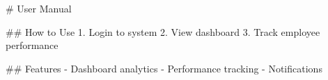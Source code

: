 
# User Manual

## How to Use
1. Login to system
2. View dashboard
3. Track employee performance

## Features
- Dashboard analytics
- Performance tracking
- Notifications
